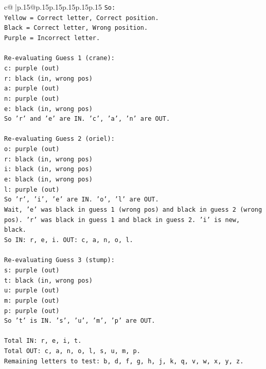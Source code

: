 \documentclass{article}
\begin{document}
{\begin{supertabular}{c@{$\;$}|p{.15\linewidth}@{}p{.15\linewidth}p{.15\linewidth}p{.15\linewidth}p{.15\linewidth}p{.15\linewidth}}
{{{\texttt{So:} \\
\texttt{Yellow = Correct letter, Correct position.} \\
\texttt{Black = Correct letter, Wrong position.} \\
\texttt{Purple = Incorrect letter.} \\
\\ 
\texttt{Re{-}evaluating Guess 1 (crane):} \\
\texttt{c: purple (out)} \\
\texttt{r: black (in, wrong pos)} \\
\texttt{a: purple (out)} \\
\texttt{n: purple (out)} \\
\texttt{e: black (in, wrong pos)} \\
\texttt{So 'r' and 'e' are IN. 'c', 'a', 'n' are OUT.} \\
\\ 
\texttt{Re{-}evaluating Guess 2 (oriel):} \\
\texttt{o: purple (out)} \\
\texttt{r: black (in, wrong pos)} \\
\texttt{i: black (in, wrong pos)} \\
\texttt{e: black (in, wrong pos)} \\
\texttt{l: purple (out)} \\
\texttt{So 'r', 'i', 'e' are IN. 'o', 'l' are OUT.} \\
\texttt{Wait, 'e' was black in guess 1 (wrong pos) and black in guess 2 (wrong pos). 'r' was black in guess 1 and black in guess 2. 'i' is new, black.} \\
\texttt{So IN: r, e, i. OUT: c, a, n, o, l.} \\
\\ 
\texttt{Re{-}evaluating Guess 3 (stump):} \\
\texttt{s: purple (out)} \\
\texttt{t: black (in, wrong pos)} \\
\texttt{u: purple (out)} \\
\texttt{m: purple (out)} \\
\texttt{p: purple (out)} \\
\texttt{So 't' is IN. 's', 'u', 'm', 'p' are OUT.} \\
\\ 
\texttt{Total IN: r, e, i, t.} \\
\texttt{Total OUT: c, a, n, o, l, s, u, m, p.} \\
\texttt{Remaining letters to test: b, d, f, g, h, j, k, q, v, w, x, y, z.} \\
}}}
\end{supertabular}}
\end{document}
